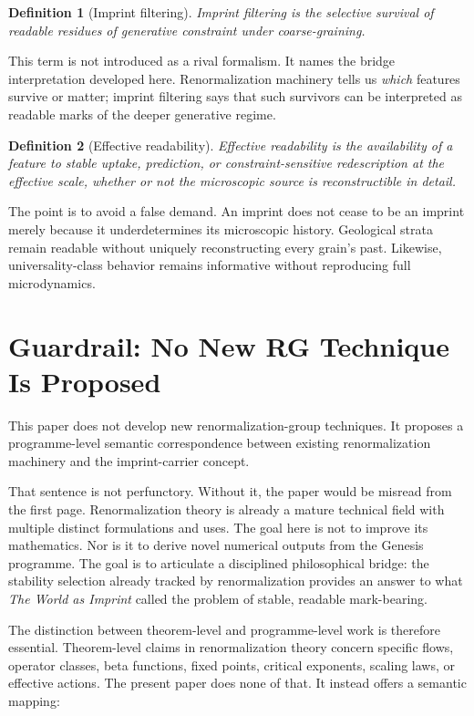 \documentclass[12pt]{article}
\newtheorem{definition}{Definition}[section]
\begin{document}
\begin{definition}[Imprint filtering]
\emph{Imprint filtering} is the selective survival of readable residues of generative constraint under coarse-graining.
\end{definition}

This term is not introduced as a rival formalism. It names the bridge interpretation developed here. Renormalization machinery tells us \emph{which} features survive or matter; imprint filtering says that such survivors can be interpreted as readable marks of the deeper generative regime.

\begin{definition}[Effective readability]
\emph{Effective readability} is the availability of a feature to stable uptake, prediction, or constraint-sensitive redescription at the effective scale, whether or not the microscopic source is reconstructible in detail.
\end{definition}

The point is to avoid a false demand. An imprint does not cease to be an imprint merely because it underdetermines its microscopic history. Geological strata remain readable without uniquely reconstructing every grain's past. Likewise, universality-class behavior remains informative without reproducing full microdynamics.

\section{Guardrail: No New RG Technique Is Proposed}

This paper does not develop new renormalization-group techniques. It proposes a programme-level semantic correspondence between existing renormalization machinery and the imprint-carrier concept.

That sentence is not perfunctory. Without it, the paper would be misread from the first page. Renormalization theory is already a mature technical field with multiple distinct formulations and uses. The goal here is not to improve its mathematics. Nor is it to derive novel numerical outputs from the Genesis programme. The goal is to articulate a disciplined philosophical bridge: the stability selection already tracked by renormalization provides an answer to what \emph{The World as Imprint} called the problem of stable, readable mark-bearing.

The distinction between theorem-level and programme-level work is therefore essential. Theorem-level claims in renormalization theory concern specific flows, operator classes, beta functions, fixed points, critical exponents, scaling laws, or effective actions. The present paper does none of that. It instead offers a semantic mapping:
\end{document}
